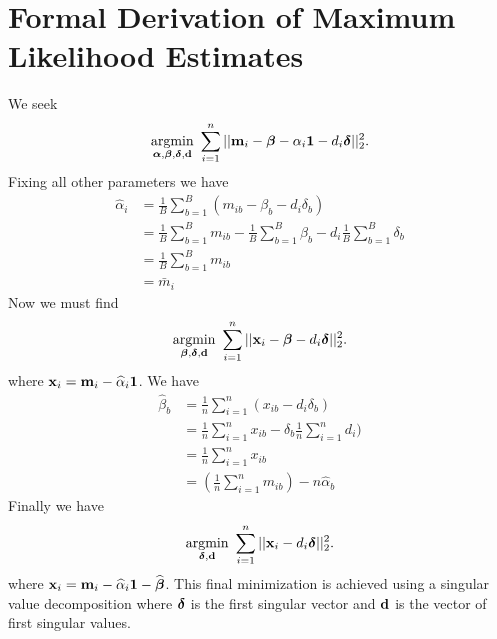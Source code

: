 \documentclass[12pt]{article}
\newcommand{\argmin}[1]{\underset{#1}{\operatorname{argmin}}\text{ }}
\newcommand{\V}[1]{{\bm{\mathbf{\MakeLowercase{#1}}}}} %
\begin{document}
\section{Formal Derivation of Maximum Likelihood Estimates}

We seek
\begin{equation*}
\argmin{\V{\alpha},\V{\beta},\V{\delta},\V{d}} \sum_{i=1}^n || \V{m}_i - \V{\beta} - \alpha_i\V{1} - d_i\V{\delta}||_2^2.
\end{equation*}
Fixing all other parameters we have
\begin{align*}
\widehat{\alpha}_i &= \frac{1}{B} \sum_{b=1}^B (m_{ib} - \beta_{b} - d_i\delta_b)\\
&= \frac{1}{B} \sum_{b=1}^B m_{ib} - \frac{1}{B}\sum_{b=1}^B \beta_{b} - d_i\frac{1}{B}\sum_{b=1}^B\delta_b\\
&= \frac{1}{B} \sum_{b=1}^B m_{ib}\\
&= \bar{m}_i
\end{align*}
Now we must find
\begin{equation*}
\argmin{\V{\beta},\V{\delta},\V{d}} \sum_{i=1}^n || \V{x}_i - \V{\beta} - d_i\V{\delta}||_2^2.
\end{equation*}
where $\V{x}_i = \V{m}_{i} - \widehat{\alpha}_i\V{1}$. We have
\begin{align*}
\widehat{\beta}_b &= \frac{1}{n}\sum_{i=1}^n (x_{ib} - d_i\delta_b)\\
&= \frac{1}{n}\sum_{i=1}^n x_{ib} - \delta_b \frac{1}{n} \sum_{i=1}^n d_i)\\
&= \frac{1}{n}\sum_{i=1}^n x_{ib}\\
&= \left(\frac{1}{n}\sum_{i=1}^n m_{ib}\right) - n\widehat{\alpha}_b
\end{align*}
Finally we have
\begin{equation*}
\argmin{\V{\delta},\V{d}} \sum_{i=1}^n || \V{x}_i - d_i\V{\delta}||_2^2.
\end{equation*}
where $\V{x}_i = \V{m}_{i} - \widehat{\alpha}_i\V{1} - \widehat{\V{\beta}}$. This final minimization is achieved using a singular value decomposition where $\V{\delta}$ is the first singular vector and $\V{d}$ is the vector of first singular values.



%
%
\end{document}

